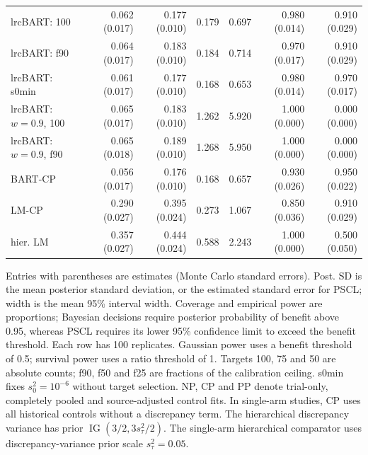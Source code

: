 \begin{landscape}
\begin{longtable}{lrrrrrr}
lrcBART: 100 & 0.062 (0.017) & 0.177 (0.010) & 0.179 & 0.697 & 0.980 (0.014) & 0.910 (0.029) \\
lrcBART: f90 & 0.064 (0.017) & 0.183 (0.010) & 0.184 & 0.714 & 0.970 (0.017) & 0.910 (0.029) \\
lrcBART: s0min & 0.061 (0.017) & 0.177 (0.010) & 0.168 & 0.653 & 0.980 (0.014) & 0.970 (0.017) \\
lrcBART: $w=0.9$, 100 & 0.065 (0.017) & 0.183 (0.010) & 1.262 & 5.920 & 1.000 (0.000) & 0.000 (0.000) \\
lrcBART: $w=0.9$, f90 & 0.065 (0.018) & 0.189 (0.010) & 1.268 & 5.950 & 1.000 (0.000) & 0.000 (0.000) \\
BART-CP & 0.056 (0.017) & 0.176 (0.010) & 0.168 & 0.657 & 0.930 (0.026) & 0.950 (0.022) \\
LM-CP & 0.290 (0.027) & 0.395 (0.024) & 0.273 & 1.067 & 0.850 (0.036) & 0.910 (0.029) \\
hier. LM & 0.357 (0.027) & 0.444 (0.024) & 0.588 & 2.243 & 1.000 (0.000) & 0.500 (0.050) \\
\end{longtable}
\noindent\begin{minipage}{\linewidth}\footnotesize Entries with parentheses are estimates (Monte Carlo standard errors). Post. SD is the mean posterior standard deviation, or the estimated standard error for PSCL; width is the mean 95\% interval width. Coverage and empirical power are proportions; Bayesian decisions require posterior probability of benefit above 0.95, whereas PSCL requires its lower 95\% confidence limit to exceed the benefit threshold. Each row has 100 replicates. Gaussian power uses a benefit threshold of 0.5; survival power uses a ratio threshold of 1. Targets 100, 75 and 50 are absolute counts; f90, f50 and f25 are fractions of the calibration ceiling. s0min fixes $s_0^2=10^{-6}$ without target selection. NP, CP and PP denote trial-only, completely pooled and source-adjusted control fits. In single-arm studies, CP uses all historical controls without a discrepancy term. The hierarchical discrepancy variance has prior $\operatorname{IG}(3/2,3s_\tau^2/2)$. The single-arm hierarchical comparator uses discrepancy-variance prior scale $s_\tau^2=0.05$.\end{minipage}
\endgroup
\end{landscape}
